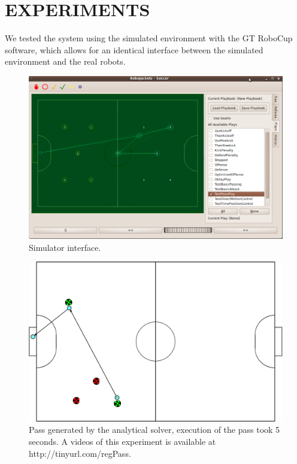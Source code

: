 \documentclass[a4paper, 10pt, conference]{ieeeconf}      %
\begin{document}
\section{EXPERIMENTS}
We tested the system using the simulated environment with the GT RoboCup software, which allows for an identical interface between the simulated environment and the real robots.

\begin{figure}[ht!]
\begin{center}
\includegraphics[totalheight=1.6in]{ui}
\end{center}
\caption{Simulator interface.}
\label{experiment1fig1}
\end{figure}


\begin{figure}[ht!]
\begin{center}
\includegraphics[totalheight=1.6in]{nonoptimized_plan}
\end{center}
\caption{Pass generated by the analytical solver, execution of the pass took 5 seconds. A videos of this experiment is available at http://tinyurl.com/regPass.}
\label{experiment1fig1}
\end{figure}
\end{document}
